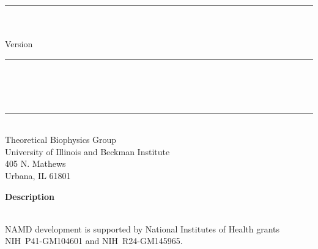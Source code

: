 
\thispagestyle{empty}

\vspace*{0.3in}

\begin{centering}
  \rule{6in}{0.04in}				\\	\vspace{0.25in}
  {\Huge \NAMD\ \DOCTITLE}			\\	\vspace{0.25in}
  {\Large Version \NAMDVER}			\\	\vspace{0.20in}
  \rule{6in}{0.04in}				\\	\vspace{0.25in}
  {\Large \NAMDAUTHORS}				\\	\vspace{0.20in}
  \NAMDDATE					\\	\vspace{0.20in}
  \rule{6in}{0.04in}				\\	\vspace{0.25in}
  {\large       Theoretical Biophysics Group}                  \\ 
  {\large       University of Illinois and Beckman Institute}  \\ 
  {\large       405 N. Mathews}                                \\ 
  {\large       Urbana, IL  61801}                             \\
\end{centering}
\vspace{0.2in}

\begin{center}
  {\Large \bf Description}
\end{center}

\noindent \DOCDESC
\vspace{0.1in} \\
NAMD development is supported by National Institutes of Health
grants NIH~P41-GM104601 and NIH~R24-GM145965.

